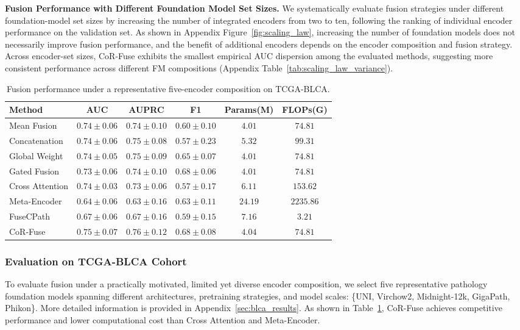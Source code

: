 \textbf{Fusion Performance with Different Foundation Model Set Sizes.}
\label{scaling law section}
We systematically evaluate fusion strategies under different foundation-model set sizes by increasing the number of integrated encoders from two to ten, following the ranking of individual encoder performance on the validation set.
As shown in Appendix Figure~\ref{fig:scaling_law}, increasing the number of foundation models does not necessarily improve fusion performance, and the benefit of additional encoders depends on the encoder composition and fusion strategy.
Across encoder-set sizes, CoR-Fuse exhibits the smallest empirical AUC dispersion among the evaluated methods, suggesting more consistent performance across different FM compositions (Appendix Table~\ref{tab:scaling_law_variance}).

\begin{table}[htbp]
\centering
\caption{Fusion performance under a representative five-encoder composition on TCGA-BLCA.}
\label{tab:blca_n5}
\begin{tabular}{lccccc}
\toprule
Method & AUC & AUPRC & F1 & Params(M) & FLOPs(G)\\
\midrule
Mean Fusion & $0.74 \pm 0.06$ & $0.74 \pm 0.10$ & $0.60 \pm 0.10$ &$4.01$ &$74.81$\\
Concatenation & $0.74 \pm 0.06$ & $0.75 \pm 0.08$ & $0.57 \pm 0.23$ &$5.32$ &$99.31$\\
Global Weight & $0.74 \pm 0.05$ & $0.75 \pm 0.09$ & $0.65 \pm 0.07$ &$4.01$ &$74.81$\\
Gated Fusion & $0.73 \pm 0.06$ & $0.74 \pm 0.10$ & $\mathbf{0.68 \pm 0.06}$ &$4.01$ &$74.81$\\
Cross Attention & $0.74 \pm 0.03$ & $0.73 \pm 0.06$ & $0.57 \pm 0.17$ &$6.11$ &$153.62$\\
Meta-Encoder & $0.64 \pm 0.06$ & $0.63 \pm 0.16$ & $0.63 \pm 0.11$ &$24.19$ &$2235.86$\\
FuseCPath & $0.67 \pm 0.06$ & $0.67 \pm 0.16$ & $0.59 \pm 0.15$ &$7.16$ &$3.21$\\
CoR-Fuse & $\mathbf{0.75 \pm 0.07}$ & $\mathbf{0.76 \pm 0.12}$ & $0.68 \pm 0.08$ &$4.04$ &$74.81$\\
\bottomrule
\end{tabular}
\end{table}

\subsubsection{Evaluation on TCGA-BLCA Cohort}
To evaluate fusion under a practically motivated, limited yet diverse encoder composition, we select five representative pathology foundation models spanning different architectures, pretraining strategies, and model scales: \{UNI, Virchow2, Midnight-12k, GigaPath, Phikon\}.
More detailed information is provided in Appendix~\ref{sec:blca_results}.
As shown in Table~\ref{tab:blca_n5}, CoR-Fuse achieves competitive performance and lower computational cost than Cross Attention and Meta-Encoder.

